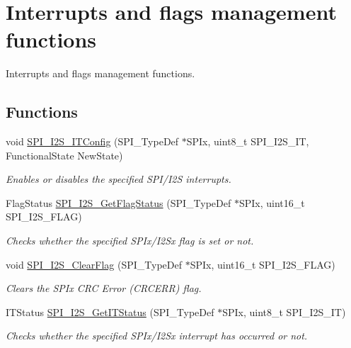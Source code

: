 \hypertarget{group___s_p_i___group5}{}\section{Interrupts and flags management functions}
\label{group___s_p_i___group5}


Interrupts and flags management functions.  


\subsection*{Functions}
\begin{DoxyCompactItemize}
\item 
void \mbox{\hyperlink{group___s_p_i___group5_ga17f4ef132e8ddbf94cb6b1688d181e41}{S\+P\+I\+\_\+\+I2\+S\+\_\+\+I\+T\+Config}} (S\+P\+I\+\_\+\+Type\+Def $\ast$S\+P\+Ix, uint8\+\_\+t S\+P\+I\+\_\+\+I2\+S\+\_\+\+IT, Functional\+State New\+State)
\begin{DoxyCompactList}\small\item\em Enables or disables the specified S\+P\+I/\+I2S interrupts. \end{DoxyCompactList}\item 
Flag\+Status \mbox{\hyperlink{group___s_p_i___group5_ga1bd785d129e09c5734a876c8f2767204}{S\+P\+I\+\_\+\+I2\+S\+\_\+\+Get\+Flag\+Status}} (S\+P\+I\+\_\+\+Type\+Def $\ast$S\+P\+Ix, uint16\+\_\+t S\+P\+I\+\_\+\+I2\+S\+\_\+\+F\+L\+AG)
\begin{DoxyCompactList}\small\item\em Checks whether the specified S\+P\+Ix/\+I2\+Sx flag is set or not. \end{DoxyCompactList}\item 
void \mbox{\hyperlink{group___s_p_i___group5_ga3aabd9e2437e213056c0ed9bdfa1a724}{S\+P\+I\+\_\+\+I2\+S\+\_\+\+Clear\+Flag}} (S\+P\+I\+\_\+\+Type\+Def $\ast$S\+P\+Ix, uint16\+\_\+t S\+P\+I\+\_\+\+I2\+S\+\_\+\+F\+L\+AG)
\begin{DoxyCompactList}\small\item\em Clears the S\+P\+Ix C\+RC Error (C\+R\+C\+E\+RR) flag. \end{DoxyCompactList}\item 
I\+T\+Status \mbox{\hyperlink{group___s_p_i___group5_ga72decbc1cd79f8fad92a2204beca6bc5}{S\+P\+I\+\_\+\+I2\+S\+\_\+\+Get\+I\+T\+Status}} (S\+P\+I\+\_\+\+Type\+Def $\ast$S\+P\+Ix, uint8\+\_\+t S\+P\+I\+\_\+\+I2\+S\+\_\+\+IT)
\begin{DoxyCompactList}\small\item\em Checks whether the specified S\+P\+Ix/\+I2\+Sx interrupt has occurred or not. \end{DoxyCompactList}\item 

\end{DoxyCompactItemize}
